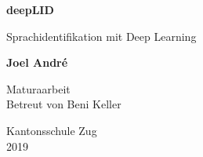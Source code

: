 \begin{titlepage}
    \begin{center}
        \vspace*{1cm}
        
        \Huge
        \textbf{deepLID}
        
        \vspace{0.5cm}
        \LARGE
        Sprachidentifikation mit Deep Learning
        
        \vspace{1.5cm}
        
        \textbf{Joel André}
        
        \vfill
        
        \Large
        Maturaarbeit\\
        Betreut von
        Beni Keller
        
        \vspace{0.8cm}
        
        
        Kantonsschule Zug\\
        2019
        
    \end{center}
\end{titlepage}